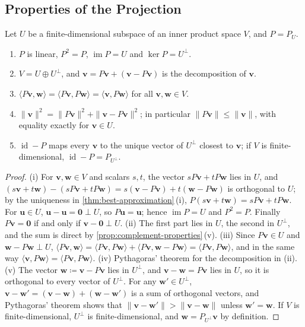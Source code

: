 \subsection{Properties of the Projection}

\begin{proposition}
\label{prop:projection-properties}
Let $U$ be a finite-dimensional subspace of an inner product space $V$, and $P=P_U$.
\begin{enumerate}
\item $P$ is linear, $P^2=P$, $\operatorname{im}P=U$ and $\ker P=U^\perp$.
\item $V=U\oplus U^\perp$, and $\mathbf v=P\mathbf v+(\mathbf v-P\mathbf v)$ is the decomposition of $\mathbf v$.
\item $\langle P\mathbf v,\mathbf w\rangle=\langle P\mathbf v,P\mathbf w\rangle=\langle\mathbf v,P\mathbf w\rangle$ for all $\mathbf v,\mathbf w\in V$.
\item $\|\mathbf v\|^2=\|P\mathbf v\|^2+\|\mathbf v-P\mathbf v\|^2$; in particular $\|P\mathbf v\|\le\|\mathbf v\|$, with equality exactly for $\mathbf v\in U$.
\item $\operatorname{id}-P$ maps every $\mathbf v$ to the unique vector of $U^\perp$ closest to $\mathbf v$; if $V$ is finite-dimensional, $\operatorname{id}-P=P_{U^\perp}$.
\end{enumerate}
\end{proposition}

\begin{proof}
(i) For $\mathbf v,\mathbf w\in V$ and scalars $s,t$, the vector $sP\mathbf v+tP\mathbf w$ lies in $U$, and $(s\mathbf v+t\mathbf w)-(sP\mathbf v+tP\mathbf w)=s(\mathbf v-P\mathbf v)+t(\mathbf w-P\mathbf w)$ is orthogonal to $U$; by the uniqueness in \cref{thm:best-approximation}\,(i), $P(s\mathbf v+t\mathbf w)=sP\mathbf v+tP\mathbf w$. For $\mathbf u\in U$, $\mathbf u-\mathbf u=\mathbf 0\perp U$, so $P\mathbf u=\mathbf u$; hence $\operatorname{im}P=U$ and $P^2=P$. Finally $P\mathbf v=\mathbf 0$ if and only if $\mathbf v-\mathbf 0\perp U$. (ii) The first part lies in $U$, the second in $U^\perp$, and the sum is direct by \cref{prop:complement-properties}\,(v). (iii) Since $P\mathbf v\in U$ and $\mathbf w-P\mathbf w\perp U$, $\langle P\mathbf v,\mathbf w\rangle=\langle P\mathbf v,P\mathbf w\rangle+\langle P\mathbf v,\mathbf w-P\mathbf w\rangle=\langle P\mathbf v,P\mathbf w\rangle$, and in the same way $\langle\mathbf v,P\mathbf w\rangle=\langle P\mathbf v,P\mathbf w\rangle$. (iv) Pythagoras' theorem for the decomposition in (ii). (v) The vector $\mathbf w\coloneqq\mathbf v-P\mathbf v$ lies in $U^\perp$, and $\mathbf v-\mathbf w=P\mathbf v$ lies in $U$, so it is orthogonal to every vector of $U^\perp$. For any $\mathbf w'\in U^\perp$, $\mathbf v-\mathbf w'=(\mathbf v-\mathbf w)+(\mathbf w-\mathbf w')$ is a sum of orthogonal vectors, and Pythagoras' theorem shows that $\|\mathbf v-\mathbf w'\|>\|\mathbf v-\mathbf w\|$ unless $\mathbf w'=\mathbf w$. If $V$ is finite-dimensional, $U^\perp$ is finite-dimensional, and $\mathbf w=P_{U^\perp}\mathbf v$ by definition.
\end{proof}

